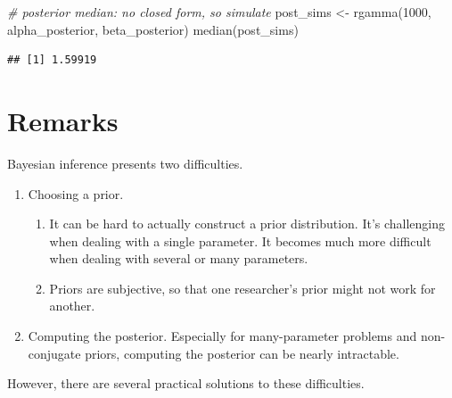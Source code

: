 \documentclass[
]{book}
\newenvironment{Shaded}{\begin{snugshade}}{\end{snugshade}}
\newcommand{\CommentTok}[1]{\textcolor[rgb]{0.56,0.35,0.01}{\textit{#1}}}
\newcommand{\DecValTok}[1]{\textcolor[rgb]{0.00,0.00,0.81}{#1}}
\newcommand{\FunctionTok}[1]{\textcolor[rgb]{0.00,0.00,0.00}{#1}}
\newcommand{\NormalTok}[1]{#1}
\newcommand{\OtherTok}[1]{\textcolor[rgb]{0.56,0.35,0.01}{#1}}
\providecommand{\tightlist}{%
  \setlength{\itemsep}{0pt}\setlength{\parskip}{0pt}}
\begin{document}
\begin{Shaded}
\begin{Highlighting}[]
\CommentTok{\# posterior median: no closed form, so simulate}
\NormalTok{post\_sims }\OtherTok{\textless{}{-}} \FunctionTok{rgamma}\NormalTok{(}\DecValTok{1000}\NormalTok{, alpha\_posterior, beta\_posterior)}
\FunctionTok{median}\NormalTok{(post\_sims)}
\end{Highlighting}
\end{Shaded}

\begin{verbatim}
## [1] 1.59919
\end{verbatim}

\hypertarget{remarks-1}{%
\section{Remarks}\label{remarks-1}}

Bayesian inference presents two difficulties.

\begin{enumerate}
\def\labelenumi{\arabic{enumi}.}
\tightlist
\item
  Choosing a prior.

  \begin{enumerate}
  \def\labelenumii{\alph{enumii}.}
  \tightlist
  \item
    It can be hard to actually construct a prior distribution. It's challenging when dealing with a single parameter. It becomes much more difficult when dealing with several or many parameters.
  \item
    Priors are subjective, so that one researcher's prior might not work for another.
  \end{enumerate}
\item
  Computing the posterior. Especially for many-parameter problems and non-conjugate priors, computing the posterior can be nearly intractable.
\end{enumerate}

However, there are several practical solutions to these difficulties.
\end{document}
